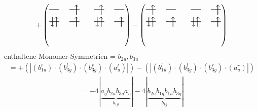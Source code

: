 \documentclass{article}
\begin{document}
\vspace{0.5cm}
\[ +\left(\text{\begin{tikzpicture}
    \draw[thick] (0,0) -- (0.5,0); %
    \draw[thick] (1,0) -- (1.5,0); %
    \draw[thick] (0,-0.6) -- (0.5,-0.6); %
    \draw[thick] (1,-0.6) -- (1.5,-0.6); %
\draw[->, thick] (1.35, -0.25) -- (1.35, 0.25); 
\draw[-> , thick] (0.35, -0.85) -- (0.35, -0.35); 
\draw[<- , thick] (0.15, -0.85) -- (0.15, -0.35); 
 \draw[-> , thick] (1.35, -0.85) -- (1.35, -0.35); 
\end{tikzpicture}\qquad \begin{tikzpicture}
    \draw[thick] (0,0) -- (0.5,0); %
    \draw[thick] (1,0) -- (1.5,0); %
    \draw[thick] (0,-0.6) -- (0.5,-0.6); %
    \draw[thick] (1,-0.6) -- (1.5,-0.6); %
\draw[->, thick] (0.35, -0.25) -- (0.35, 0.25); 
\draw[-> , thick] (0.35, -0.85) -- (0.35, -0.35); 
\draw[<- , thick] (0.15, -0.85) -- (0.15, -0.35); 
 \draw[-> , thick] (1.35, -0.85) -- (1.35, -0.35); 
\end{tikzpicture}}\right)-\left(\text{\begin{tikzpicture}
    \draw[thick] (0,0) -- (0.5,0); %
    \draw[thick] (1,0) -- (1.5,0); %
    \draw[thick] (0,-0.6) -- (0.5,-0.6); %
    \draw[thick] (1,-0.6) -- (1.5,-0.6); %
\draw[->, thick] (0.35, -0.25) -- (0.35, 0.25); 
\draw[-> , thick] (0.35, -0.85) -- (0.35, -0.35); 
\draw[<- , thick] (0.15, -0.85) -- (0.15, -0.35); 
 \draw[-> , thick] (1.35, -0.85) -- (1.35, -0.35); 
\end{tikzpicture}\qquad \begin{tikzpicture}
    \draw[thick] (0,0) -- (0.5,0); %
    \draw[thick] (1,0) -- (1.5,0); %
    \draw[thick] (0,-0.6) -- (0.5,-0.6); %
    \draw[thick] (1,-0.6) -- (1.5,-0.6); %
\draw[->, thick] (1.35, -0.25) -- (1.35, 0.25); 
\draw[-> , thick] (0.35, -0.85) -- (0.35, -0.35); 
\draw[<- , thick] (0.15, -0.85) -- (0.15, -0.35); 
 \draw[-> , thick] (1.35, -0.85) -- (1.35, -0.35); 
\end{tikzpicture}}\right)\]enthaltene Monomer-Symmetrien = $b_{2u},b_{3u}$\begin{multline*}=+\left(\left|(b_{1u}^{r}) \cdot (b_{3g}^{l}) \cdot (b_{3g}^{r}) \cdot (a_{u}^{l})\right|\right)-\left(\left|(b_{1u}^{l}) \cdot (b_{3g}^{l}) \cdot (b_{3g}^{r}) \cdot (a_{u}^{r})\right|\right)\end{multline*}
\begin{multline*}
=-4\left|\underbrace{a_{g} b_{2u} b_{3g} a_{u}}_{b_{1g}}\right|-4\left|\underbrace{b_{2u} b_{1g} b_{1u} b_{3g}}_{b_{1g}}\right|
\end{multline*}
\\\\
\end{document}
